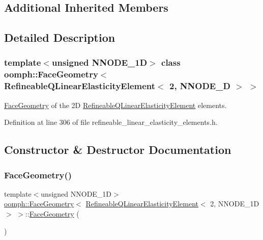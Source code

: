 \subsection*{Additional Inherited Members}


\subsection{Detailed Description}
\subsubsection*{template$<$unsigned N\+N\+O\+D\+E\+\_\+1D$>$\newline
class oomph\+::\+Face\+Geometry$<$ Refineable\+Q\+Linear\+Elasticity\+Element$<$ 2, N\+N\+O\+D\+E\+\_\+D $>$ $>$}

\hyperlink{classoomph_1_1FaceGeometry}{Face\+Geometry} of the 2D \hyperlink{classoomph_1_1RefineableQLinearElasticityElement}{Refineable\+Q\+Linear\+Elasticity\+Element} elements. 

Definition at line 306 of file refineable\+\_\+linear\+\_\+elasticity\+\_\+elements.\+h.



\subsection{Constructor \& Destructor Documentation}
\mbox{\label{classoomph_1_1FaceGeometry_3_01RefineableQLinearElasticityElement_3_012_00_01NNODE__1D_01_4_01_4_a396a61bf54bff6545305377dc07d8424}} 
\subsubsection{\texorpdfstring{Face\+Geometry()}{FaceGeometry()}}
{\footnotesize\ttfamily template$<$unsigned N\+N\+O\+D\+E\+\_\+1D$>$ \\
\hyperlink{classoomph_1_1FaceGeometry}{oomph\+::\+Face\+Geometry}$<$ \hyperlink{classoomph_1_1RefineableQLinearElasticityElement}{Refineable\+Q\+Linear\+Elasticity\+Element}$<$ 2, N\+N\+O\+D\+E\+\_\+1D $>$ $>$\+::\hyperlink{classoomph_1_1FaceGeometry}{Face\+Geometry} (\begin{DoxyParamCaption}{ }\end{DoxyParamCaption})\hspace{0.3cm}{\ttfamily [inline]}}



